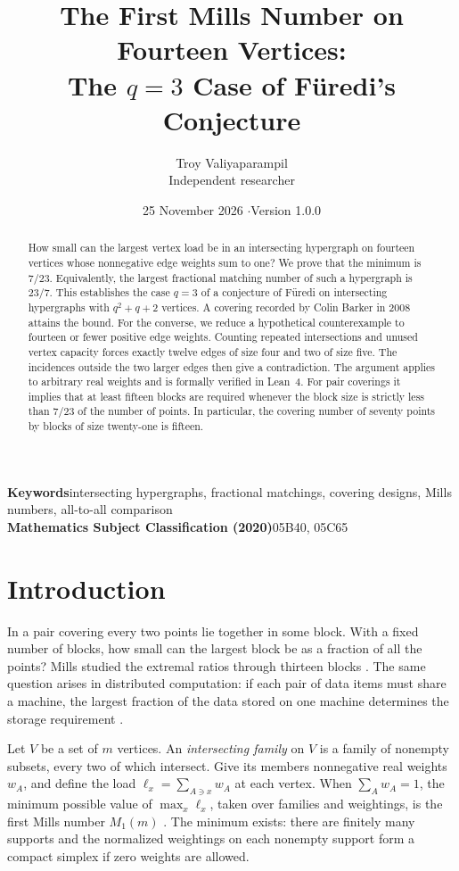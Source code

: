 \documentclass[11pt]{article}
\title{The First Mills Number on Fourteen Vertices:\\
The \(q=3\) Case of F\"uredi's Conjecture}
\author{Troy Valiyaparampil\\{\small Independent researcher}}
\date{25 November 2026 \enspace$\cdot$\enspace Version 1.0.0}
\begin{document}
\maketitle
\begin{abstract}
How small can the largest vertex load be in an intersecting hypergraph
on fourteen vertices whose nonnegative edge weights sum to one? We prove
that the minimum is \(7/23\). Equivalently, the largest fractional
matching number of such a hypergraph is \(23/7\). This establishes the
case \(q=3\) of a conjecture of F\"uredi on intersecting hypergraphs
with \(q^2+q+2\) vertices. A covering recorded by Colin Barker in 2008
attains the bound. For the converse, we reduce a hypothetical counterexample
to fourteen or fewer positive edge weights. Counting repeated
intersections and unused vertex capacity forces exactly twelve edges of
size four and two of size five. The incidences outside the two larger
edges then give a contradiction. The argument applies to arbitrary real
weights and is formally verified in Lean~4. For pair coverings it implies
that at least fifteen blocks are required whenever the block size is
strictly less than \(7/23\) of the number of points. In particular, the
covering number of seventy points by blocks of size twenty-one is fifteen.
\end{abstract}
\noindent\textbf{Keywords}\quad intersecting hypergraphs, fractional matchings,
covering designs, Mills numbers, all-to-all comparison\\
\textbf{Mathematics Subject Classification (2020)}\quad 05B40, 05C65

\section{Introduction}
In a pair covering every two points lie together in some block. With a
fixed number of blocks, how small can the largest block be as a fraction
of all the points? Mills studied the extremal ratios through thirteen
blocks \cite{mills}. The same question arises in distributed computation:
if each pair of data items must share a machine, the largest fraction
of the data stored on one machine determines the storage requirement
\cite{hhs}.

Let \(V\) be a set of \(m\) vertices. An \emph{intersecting family} on
\(V\) is a family of nonempty subsets, every two of which intersect.
Give its members nonnegative real weights \(w_A\), and define the
load \(\ell_x=\sum_{A\ni x}w_A\) at each vertex. When \(\sum_A w_A=1\),
the minimum possible value of \(\max_x\ell_x\), taken over families
and weightings, is the first Mills number \(M_1(m)\) \cite{gk}.
The minimum exists: there are finitely many supports and the normalized
weightings on each nonempty support form a compact simplex if zero
weights are allowed.
\end{document}
